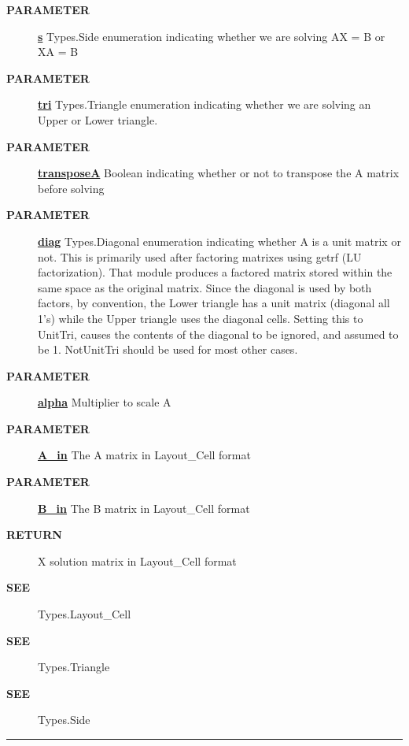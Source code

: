 \par
\begin{description}
\item [\colorbox{tagtype}{\color{white} \textbf{\textsf{PARAMETER}}}] \textbf{\underline{s}} Types.Side enumeration indicating whether we are solving AX = B or XA = B
\item [\colorbox{tagtype}{\color{white} \textbf{\textsf{PARAMETER}}}] \textbf{\underline{tri}} Types.Triangle enumeration indicating whether we are solving an Upper or Lower triangle.
\item [\colorbox{tagtype}{\color{white} \textbf{\textsf{PARAMETER}}}] \textbf{\underline{transposeA}} Boolean indicating whether or not to transpose the A matrix before solving
\item [\colorbox{tagtype}{\color{white} \textbf{\textsf{PARAMETER}}}] \textbf{\underline{diag}} Types.Diagonal enumeration indicating whether A is a unit matrix or not. This is primarily used after factoring matrixes using getrf (LU factorization). That module produces a factored matrix stored within the same space as the original matrix. Since the diagonal is used by both factors, by convention, the Lower triangle has a unit matrix (diagonal all 1's) while the Upper triangle uses the diagonal cells. Setting this to UnitTri, causes the contents of the diagonal to be ignored, and assumed to be 1. NotUnitTri should be used for most other cases.
\item [\colorbox{tagtype}{\color{white} \textbf{\textsf{PARAMETER}}}] \textbf{\underline{alpha}} Multiplier to scale A
\item [\colorbox{tagtype}{\color{white} \textbf{\textsf{PARAMETER}}}] \textbf{\underline{A\_in}} The A matrix in Layout\_Cell format
\item [\colorbox{tagtype}{\color{white} \textbf{\textsf{PARAMETER}}}] \textbf{\underline{B\_in}} The B matrix in Layout\_Cell format
\item [\colorbox{tagtype}{\color{white} \textbf{\textsf{RETURN}}}] \textbf{\underline{}} X solution matrix in Layout\_Cell format
\item [\colorbox{tagtype}{\color{white} \textbf{\textsf{SEE}}}] \textbf{\underline{}} Types.Layout\_Cell
\item [\colorbox{tagtype}{\color{white} \textbf{\textsf{SEE}}}] \textbf{\underline{}} Types.Triangle
\item [\colorbox{tagtype}{\color{white} \textbf{\textsf{SEE}}}] \textbf{\underline{}} Types.Side
\end{description}

\rule{\linewidth}{0.5pt}
